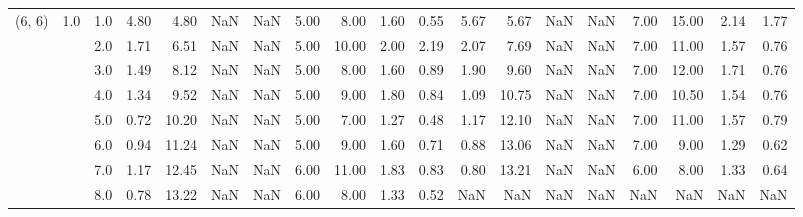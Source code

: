 \begin{tabular}{lllrrrrrrrrrrrrrrrr}
(6, 6) & 1.0 & 1.0  &      4.80 &       4.80 &               NaN &                NaN & 5.00 &   8.00 &             1.60 &                         0.55 &      5.67 &       5.67 &               NaN &                NaN & 7.00 &  15.00 &             2.14 &                         1.77 \\
       &     & 2.0  &      1.71 &       6.51 &               NaN &                NaN & 5.00 &  10.00 &             2.00 &                         2.19 &      2.07 &       7.69 &               NaN &                NaN & 7.00 &  11.00 &             1.57 &                         0.76 \\
       &     & 3.0  &      1.49 &       8.12 &               NaN &                NaN & 5.00 &   8.00 &             1.60 &                         0.89 &      1.90 &       9.60 &               NaN &                NaN & 7.00 &  12.00 &             1.71 &                         0.76 \\
       &     & 4.0  &      1.34 &       9.52 &               NaN &                NaN & 5.00 &   9.00 &             1.80 &                         0.84 &      1.09 &      10.75 &               NaN &                NaN & 7.00 &  10.50 &             1.54 &                         0.76 \\
       &     & 5.0  &      0.72 &      10.20 &               NaN &                NaN & 5.00 &   7.00 &             1.27 &                         0.48 &      1.17 &      12.10 &               NaN &                NaN & 7.00 &  11.00 &             1.57 &                         0.79 \\
       &     & 6.0  &      0.94 &      11.24 &               NaN &                NaN & 5.00 &   9.00 &             1.60 &                         0.71 &      0.88 &      13.06 &               NaN &                NaN & 7.00 &   9.00 &             1.29 &                         0.62 \\
       &     & 7.0  &      1.17 &      12.45 &               NaN &                NaN & 6.00 &  11.00 &             1.83 &                         0.83 &      0.80 &      13.21 &               NaN &                NaN & 6.00 &   8.00 &             1.33 &                         0.64 \\
       &     & 8.0  &      0.78 &      13.22 &               NaN &                NaN & 6.00 &   8.00 &             1.33 &                         0.52 &       NaN &        NaN &               NaN &                NaN &  NaN &    NaN &              NaN &                          NaN \\

\end{tabular}
